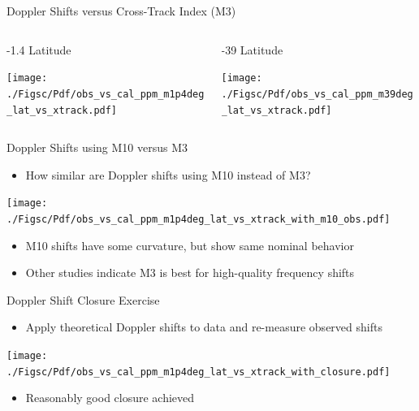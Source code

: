 \documentclass[10pt,t]{beamer}
\begin{document}
\begin{frame}[label={sec:orgf37a025}]{Doppler Shifts versus Cross-Track Index (M3)}
\begin{columns}
\begin{column}{0.55\columnwidth}
\begin{block}{-1.4\textdegree{} Latitude}
\begin{center}
\texttt{[image: ./Figsc/Pdf/obs\_vs\_cal\_ppm\_m1p4deg\_lat\_vs\_xtrack.pdf]}
\end{center}
\end{block}
\end{column}

\begin{column}{0.55\columnwidth}
\begin{block}{-39\textdegree{} Latitude}
\begin{center}
\texttt{[image: ./Figsc/Pdf/obs\_vs\_cal\_ppm\_m39deg\_lat\_vs\_xtrack.pdf]}
\end{center}
\end{block}
\end{column}
\end{columns}
\end{frame}

\begin{frame}[label={sec:org8d76eaa}]{Doppler Shifts using M10 versus M3}
\vspace{-0.1in}
\begin{itemize}
\item How similar are Doppler shifts using M10 instead of M3?
\end{itemize}

\begin{center}
\texttt{[image: ./Figsc/Pdf/obs\_vs\_cal\_ppm\_m1p4deg\_lat\_vs\_xtrack\_with\_m10\_obs.pdf]}
\end{center}
\vspace{-0.1in}
\begin{itemize}
\item \small M10 shifts have some curvature, but show same nominal behavior
\item \small Other studies indicate M3 is best for high-quality frequency shifts
\end{itemize}
\end{frame}

\begin{frame}[label={sec:orgac88f2b}]{Doppler Shift Closure Exercise}
\vspace{-0.1in}
\begin{itemize}
\item Apply theoretical Doppler shifts to data and re-measure observed shifts
\end{itemize}

\begin{center}
\texttt{[image: ./Figsc/Pdf/obs\_vs\_cal\_ppm\_m1p4deg\_lat\_vs\_xtrack\_with\_closure.pdf]}
\end{center}
\vspace{-0.1in}
\begin{itemize}
\item \small Reasonably good closure achieved
\end{itemize}
\end{frame}
\end{document}
